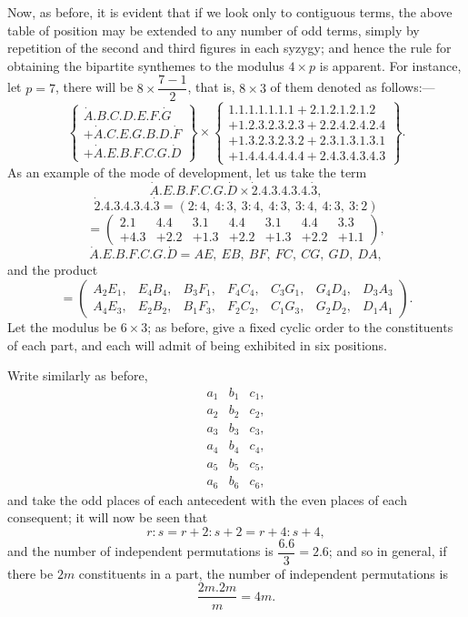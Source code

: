 \documentclass[11pt]{article}
\newcommand{\sourcepage}[1]{\marginpar{\scriptsize p.~#1}}
\newcommand{\dotter}[1]{\dot{#1}}
\begin{document}
{{\sourcepage{99}
Now, as before, it is evident that if we look only to contiguous terms, the above table of position may be extended to any number of odd terms, simply by repetition of the second and third figures in each syzygy; and hence the rule for obtaining the bipartite synthemes to the modulus $4\times p$ is apparent. For instance, let $p=7$, there will be $8\times\dfrac{7-1}{2}$, that is, $8\times3$ of them denoted as follows:---
\[
\left\{\begin{array}{l}
\dotter A.B.C.D.E.F.\dotter G\\
+\dotter A.C.E.G.B.D.\dotter F\\
+\dotter A.E.B.F.C.G.\dotter D
\end{array}\right\}
\times
\left\{\begin{array}{l}
1.1.1.1.1.1.1+2.1.2.1.2.1.2\\
+1.2.3.2.3.2.3+2.2.4.2.4.2.4\\
+1.3.2.3.2.3.2+2.3.1.3.1.3.1\\
+1.4.4.4.4.4.4+2.4.3.4.3.4.3
\end{array}\right\}.
\]
As an example of the mode of development, let us take the term
\[
\dotter A.E.B.F.C.G.\dotter D\times \dotter2.4.3.4.3.4.\dotter3,
\]
\[
\dotter2.4.3.4.3.4.\dotter3=(2:4,\ 4:3,\ 3:4,\ 4:3,\ 3:4,\ 4:3,\ 3:2)
\]
\[
=\left(\begin{array}{ccccccc}
2.1&4.4&3.1&4.4&3.1&4.4&3.3\\
+4.3&+2.2&+1.3&+2.2&+1.3&+2.2&+1.1
\end{array}\right),
\]
\[
\dotter A.E.B.F.C.G.\dotter D=AE,\ EB,\ BF,\ FC,\ CG,\ GD,\ DA,
\]
and the product
\[
=\left(\begin{array}{lllllll}
A_2E_1,&E_4B_4,&B_3F_1,&F_4C_4,&C_3G_1,&G_4D_4,&D_3A_3\\
A_4E_3,&E_2B_2,&B_1F_3,&F_2C_2,&C_1G_3,&G_2D_2,&D_1A_1
\end{array}\right).
\]
Let the modulus be $6\times3$; as before, give a fixed cyclic order to the constituents of each part, and each will admit of being exhibited in six positions.

Write similarly as before,
\[
\begin{array}{lll}
a_1&b_1&c_1,\\
a_2&b_2&c_2,\\
a_3&b_3&c_3,\\
a_4&b_4&c_4,\\
a_5&b_5&c_5,\\
a_6&b_6&c_6,
\end{array}
\]
and take the odd places of each antecedent with the even places of each consequent; it will now be seen that
\[
r:s=r+2:s+2=r+4:s+4,
\]
and the number of independent permutations is $\dfrac{6.6}{3}=2.6$; and so in general, if there be $2m$ constituents in a part, the number of independent permutations is
\[
\frac{2m.2m}{m}=4m.
\]

}}
\end{document}
